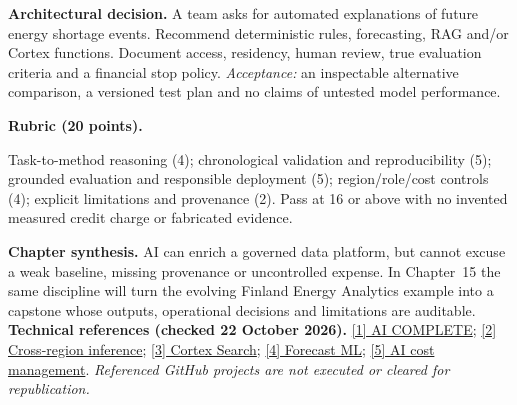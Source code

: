 \documentclass[11pt,twoside]{article}
\begin{document}
\textbf{Architectural decision.} A team asks for automated explanations of future energy shortage events. Recommend deterministic rules, forecasting, RAG and/or Cortex functions. Document access, residency, human review, true evaluation criteria and a financial stop policy. \emph{Acceptance:} an inspectable alternative comparison, a versioned test plan and no claims of untested model performance.
\begin{whitebox}\textbf{Rubric (20 points).}\par
Task-to-method reasoning (4); chronological validation and reproducibility (5); grounded evaluation and responsible deployment (5); region/role/cost controls (4); explicit limitations and provenance (2). Pass at 16 or above with no invented measured credit charge or fabricated evidence.
\end{whitebox}
\textbf{Chapter synthesis.} AI can enrich a governed data platform, but cannot excuse a weak baseline, missing provenance or uncontrolled expense. In Chapter~15 the same discipline will turn the evolving Finland Energy Analytics example into a capstone whose outputs, operational decisions and limitations are auditable.
{\fontsize{7.6}{9}\selectfont\textbf{Technical references (checked 22 October 2026).} \href{https://docs.snowflake.com/en/sql-reference/functions/ai_complete}{[1] AI COMPLETE}; \href{https://docs.snowflake.com/en/user-guide/snowflake-cortex/cross-region-inference}{[2] Cross-region inference}; \href{https://docs.snowflake.com/en/user-guide/snowflake-cortex/cortex-search/cortex-search-overview}{[3] Cortex Search}; \href{https://docs.snowflake.com/en/sql-reference/classes/forecast/commands/create-forecast}{[4] Forecast ML}; \href{https://docs.snowflake.com/en/user-guide/snowflake-cortex/ai-func-cost-management}{[5] AI cost management}. \textit{Referenced GitHub projects are not executed or cleared for republication.}}
\end{document}
